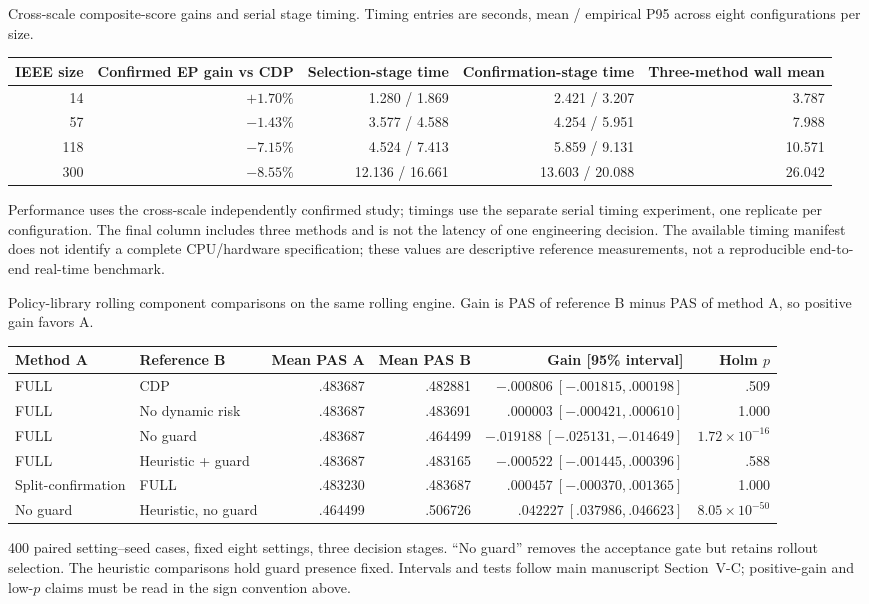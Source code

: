 \documentclass[10pt]{article}
\makeatletter
\newcommand{\tablefoot}[1]{\par\vspace{3pt}\begin{minipage}{\linewidth}\footnotesize #1\end{minipage}}
\newenvironment{exporttable}{\par\noindent\begin{minipage}{\linewidth}\def\@captype{table}}{\end{minipage}\par}
\makeatother
\begin{document}
\clearpage
\setcounter{table}{3}
\begin{exporttable}
\centering\small
\caption{Cross-scale composite-score gains and serial stage timing. Timing entries are seconds, mean / empirical P95 across eight configurations per size.}
\label{tab:scale_timing}
\begin{tabular}{rrrrr}
\toprule
IEEE size & Confirmed EP gain vs CDP & Selection-stage time & Confirmation-stage time & Three-method wall mean\\
\midrule
14 & $+1.70\%$ & 1.280 / 1.869 & 2.421 / 3.207 & 3.787\\
57 & $-1.43\%$ & 3.577 / 4.588 & 4.254 / 5.951 & 7.988\\
118 & $-7.15\%$ & 4.524 / 7.413 & 5.859 / 9.131 & 10.571\\
300 & $-8.55\%$ & 12.136 / 16.661 & 13.603 / 20.088 & 26.042\\
\bottomrule
\end{tabular}
\tablefoot{Performance uses the cross-scale independently confirmed study; timings use the separate serial timing experiment, one replicate per configuration. The final column includes three methods and is not the latency of one engineering decision. The available timing manifest does not identify a complete CPU/hardware specification; these values are descriptive reference measurements, not a reproducible end-to-end real-time benchmark.}
\end{exporttable}
\clearpage
\setcounter{table}{4}
\begin{exporttable}
\centering\small
\caption{Policy-library rolling component comparisons on the same rolling engine. Gain is PAS of reference B minus PAS of method A, so positive gain favors A.}
\label{tab:rolling_ablation}
\begin{tabular}{llrrrr}
\toprule
Method A & Reference B & Mean PAS A & Mean PAS B & Gain [95\% interval] & Holm $p$\\
\midrule
FULL & CDP & .483687 & .482881 & $-.000806\ [-.001815,.000198]$ & .509\\
FULL & No dynamic risk & .483687 & .483691 & $.000003\ [-.000421,.000610]$ & 1.000\\
FULL & No guard & .483687 & .464499 & $-.019188\ [-.025131,-.014649]$ & $1.72\!\times\!10^{-16}$\\
FULL & Heuristic + guard & .483687 & .483165 & $-.000522\ [-.001445,.000396]$ & .588\\
Split-confirmation & FULL & .483230 & .483687 & $.000457\ [-.000370,.001365]$ & 1.000\\
No guard & Heuristic, no guard & .464499 & .506726 & $.042227\ [.037986,.046623]$ & $8.05\!\times\!10^{-50}$\\
\bottomrule
\end{tabular}
\tablefoot{400 paired setting--seed cases, fixed eight settings, three decision stages. ``No guard'' removes the acceptance gate but retains rollout selection. The heuristic comparisons hold guard presence fixed. Intervals and tests follow main manuscript Section~V-C; positive-gain and low-$p$ claims must be read in the sign convention above.}
\end{exporttable}
\end{document}
